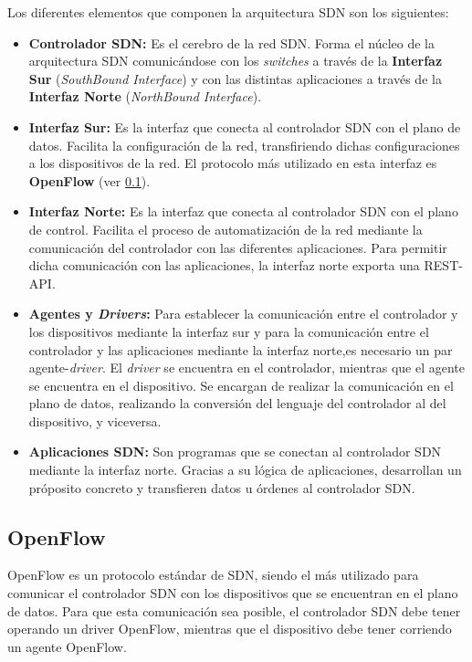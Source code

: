 Los diferentes elementos que componen la arquitectura SDN son los siguientes:

\begin{itemize}
	\item \textbf{Controlador SDN:} Es el cerebro de la red SDN. Forma el núcleo de la arquitectura SDN comunicándose con los \textit{switches} a través de la \textbf{Interfaz Sur} (\textit{SouthBound Interface}) y con las distintas aplicaciones a través de la \textbf{Interfaz Norte} (\textit{NorthBound Interface}).
	
	\item \textbf{Interfaz Sur:} Es la interfaz que conecta al controlador SDN con el plano de datos. Facilita la configuración de la red, transfiriendo dichas configuraciones a los dispositivos de la red. El protocolo más utilizado en esta interfaz es \textbf{OpenFlow} (ver \ref{subsec:openflow}).
	
	\item \textbf{Interfaz Norte:} Es la interfaz que conecta al controlador SDN con el plano de control. Facilita el proceso de automatización de la red mediante la comunicación del controlador con las diferentes aplicaciones. Para permitir dicha comunicación con las aplicaciones, la interfaz norte exporta una REST-API.
	
	\item \textbf{Agentes y \textit{Drivers}:} Para establecer la comunicación entre el controlador y los dispositivos mediante la interfaz sur y para la comunicación entre el controlador y las aplicaciones mediante la interfaz norte,es necesario un par agente-\textit{driver}. El \textit{driver} se encuentra en el controlador, mientras que el agente se encuentra en el dispositivo. Se encargan de realizar la comunicación en el plano de datos, realizando la conversión del lenguaje del controlador al del dispositivo, y viceversa.
	
	\item \textbf{Aplicaciones SDN:} Son programas que se conectan al controlador SDN mediante la interfaz norte. Gracias a su lógica de aplicaciones, desarrollan un próposito concreto y transfieren datos u órdenes al controlador SDN.
\end{itemize}


\subsection{OpenFlow}
\label{subsec:openflow}

OpenFlow es un protocolo estándar de SDN, siendo el más utilizado para comunicar el controlador SDN con los dispositivos que se encuentran en el plano de datos. Para que esta comunicación sea posible, el controlador SDN debe tener operando un driver OpenFlow, mientras que el dispositivo debe tener corriendo un agente OpenFlow. 

